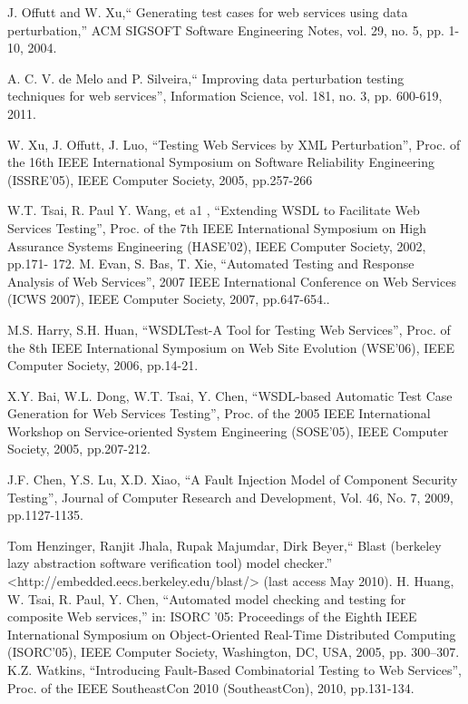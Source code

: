 \documentclass{bredelebeamer}
\begin{document}
\begin{frame}[allowframebreaks]
\begin{thebibliography}{9}
	J. Offutt and W. Xu,`` Generating test cases for web
	services using data perturbation,'' ACM SIGSOFT Software
	Engineering Notes, vol. 29, no. 5, pp. 1-10, 2004.
	
	 A. C. V. de Melo and P. Silveira,`` Improving data
	perturbation testing techniques for web services'',
	Information Science, vol. 181, no. 3, pp. 600-619, 2011.
	
	W. Xu, J. Offutt, J. Luo, ``Testing Web Services by XML
	Perturbation'', Proc. of the 16th IEEE International Symposium on
	Software Reliability Engineering (ISSRE’05), IEEE Computer
	Society, 2005, pp.257-266
	
	W.T. Tsai, R. Paul Y. Wang, et a1 , ``Extending WSDL to Facilitate
	Web Services Testing'', Proc. of the 7th IEEE International
	Symposium on High Assurance Systems Engineering (HASE’02),
	IEEE Computer Society, 2002, pp.171- 172.
	\framebreak
	M. Evan, S. Bas, T. Xie, ``Automated Testing and Response Analysis
	of Web Services'', 2007 IEEE International Conference on Web
	Services (ICWS 2007), IEEE Computer Society, 2007, pp.647-654..
	
	M.S. Harry, S.H. Huan, ``WSDLTest-A Tool for Testing Web
	Services'', Proc. of the 8th IEEE International Symposium on Web
	Site Evolution (WSE’06), IEEE Computer Society, 2006, pp.14-21.
	
	X.Y. Bai, W.L. Dong, W.T. Tsai, Y. Chen, ``WSDL-based Automatic
	Test Case Generation for Web Services Testing'', Proc. of the 2005
	IEEE International Workshop on Service-oriented System
	Engineering (SOSE’05), IEEE Computer Society, 2005, pp.207-212.
	
	J.F. Chen, Y.S. Lu, X.D. Xiao, ``A Fault Injection Model of
	Component Security Testing'', Journal of Computer Research and
	Development, Vol. 46, No. 7, 2009, pp.1127-1135.
	
	Tom Henzinger, Ranjit Jhala, Rupak Majumdar, Dirk Beyer,`` Blast (berkeley lazy abstraction software verification tool) model checker.'' <http://embedded.eecs.berkeley.edu/blast/> (last access May 2010).
	H. Huang, W. Tsai, R. Paul, Y. Chen, ``Automated model checking and testing for composite Web services,'' in: ISORC ’05: Proceedings of the Eighth IEEE
	International Symposium on Object-Oriented Real-Time Distributed Computing (ISORC’05), IEEE Computer Society, Washington, DC, USA, 2005, pp.
	300–307.
	K.Z. Watkins, ``Introducing Fault-Based Combinatorial Testing to
	Web Services'', Proc. of the IEEE SoutheastCon 2010
	(SoutheastCon), 2010, pp.131-134.
	

\end{thebibliography}
\end{frame}
\end{document}

